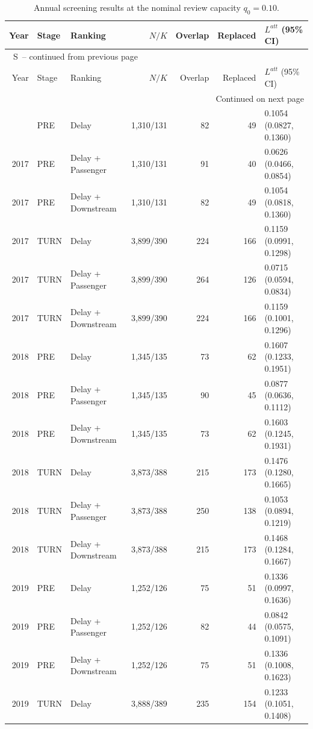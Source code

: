 \documentclass[10pt,a4paper]{article}
\numberwithin{equation}{section}
\renewcommand{\thetable}{S\arabic{table}}
\begin{document}
\scriptsize
\begin{longtable}{r l l r r r l}
\caption{Annual screening results at the nominal review capacity $q_0=0.10$.}\label{tab:s3}\\
\toprule
Year & Stage & Ranking & $N/K$ & Overlap & Replaced & $L^{att}$ (95\% CI) \\
\midrule
\endfirsthead
\multicolumn{7}{l}{\tablename\ \thetable\ -- continued from previous page}\\
\toprule
Year & Stage & Ranking & $N/K$ & Overlap & Replaced & $L^{att}$ (95\% CI) \\
\midrule
\endhead
\midrule
\multicolumn{7}{r}{Continued on next page}\\
\endfoot
\bottomrule
\endlastfoot
2017 & PRE & Delay & 1,310/131 & 82 & 49 & 0.1054 (0.0827, 0.1360) \\
2017 & PRE & Delay + Passenger & 1,310/131 & 91 & 40 & 0.0626 (0.0466, 0.0854) \\
2017 & PRE & Delay + Downstream & 1,310/131 & 82 & 49 & 0.1054 (0.0818, 0.1360) \\
2017 & TURN & Delay & 3,899/390 & 224 & 166 & 0.1159 (0.0991, 0.1298) \\
2017 & TURN & Delay + Passenger & 3,899/390 & 264 & 126 & 0.0715 (0.0594, 0.0834) \\
2017 & TURN & Delay + Downstream & 3,899/390 & 224 & 166 & 0.1159 (0.1001, 0.1296) \\
2018 & PRE & Delay & 1,345/135 & 73 & 62 & 0.1607 (0.1233, 0.1951) \\
2018 & PRE & Delay + Passenger & 1,345/135 & 90 & 45 & 0.0877 (0.0636, 0.1112) \\
2018 & PRE & Delay + Downstream & 1,345/135 & 73 & 62 & 0.1603 (0.1245, 0.1931) \\
2018 & TURN & Delay & 3,873/388 & 215 & 173 & 0.1476 (0.1280, 0.1665) \\
2018 & TURN & Delay + Passenger & 3,873/388 & 250 & 138 & 0.1053 (0.0894, 0.1219) \\
2018 & TURN & Delay + Downstream & 3,873/388 & 215 & 173 & 0.1468 (0.1284, 0.1667) \\
2019 & PRE & Delay & 1,252/126 & 75 & 51 & 0.1336 (0.0997, 0.1636) \\
2019 & PRE & Delay + Passenger & 1,252/126 & 82 & 44 & 0.0842 (0.0575, 0.1091) \\
2019 & PRE & Delay + Downstream & 1,252/126 & 75 & 51 & 0.1336 (0.1008, 0.1623) \\
2019 & TURN & Delay & 3,888/389 & 235 & 154 & 0.1233 (0.1051, 0.1408) \\

\end{longtable}
\end{document}
